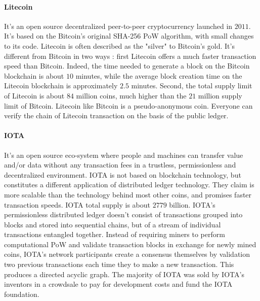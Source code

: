 \paragraph{Litecoin} It's an open source decentralized peer-to-peer cryptocurrency launched in $2011$. It's based on the Bitcoin's original SHA-256 PoW algorithm, with small changes to its code. Litecoin is often described as the "silver" to Bitcoin's gold. It's different from Bitcoin in two ways : first Litecoin offers a much faster transaction speed than Bitcoin. Indeed, the time needed to generate a block on the Bitcoin blockchain is about $10$ minutes, while the average block creation time on the Litecoin blockchain is approximately $2.5$ minutes. Second, the total supply limit of Litecoin is about $84$ million coins, much higher than the $21$ million supply limit of Bitcoin. Litecoin like Bitcoin is a pseudo-anonymous coin. Everyone can verify the chain of Litecoin transaction on the basis of the public ledger.

\paragraph{IOTA} It's an open source eco-system where people and machines can transfer value and/or data without any transaction fees in a trustless, permissionless and decentralized environment. IOTA is not based on blockchain technology, but constitutes a different application of distributed ledger technology. They claim is more scalable than the technology behind most other coins, and promises faster transaction speeds. IOTA total supply is about $2779$ billion. IOTA's permissionless distributed ledger doesn't consist of transactions grouped into blocks and stored into sequential chains, but of a stream of individual transactions entangled together. Instead of requiring miners to perform computational PoW and validate transaction blocks in exchange for newly mined coins, IOTA's network participants create a consensus themselves by validation two previous transactions each time they to make a new transaction. This produces a directed acyclic graph. The majority of IOTA was sold by IOTA's inventors in a crowdsale to pay for development costs and fund the IOTA foundation.

